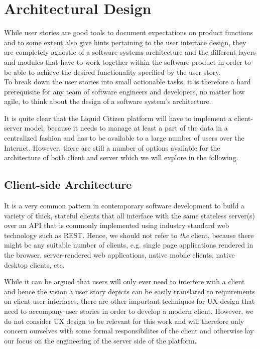 \section{Architectural Design}
\label{sec:ArchitecturalDesign}

While user stories are good tools to document expectations on product functions and to some extent also give hints pertaining to the user interface design, they are completely agnostic of a software systems architecture and the different layers and modules that have to work together within the software product in order to be able to achieve the desired functionality specified by the user story.\\
To break down the user stories into small actionable tasks, it is therefore a hard prerequisite for any team of software engineers and developers, no matter how agile, to think about the design of a software system's architecture.

It is quite clear that the Liquid Citizen platform will have to implement a client-server model, because it needs to manage at least a part of the data in a centralized fashion and has to be available to a large number of users over the Internet.
However, there are still a number of options available for the architecture of both client and server which we will explore in the following.

\subsection{Client-side Architecture}
\label{ssec:ClientSideArchitecture}
It is a very common pattern in contemporary software development to build a variety of thick, stateful clients that all interface with the same stateless server(s) over an API that is commonly implemented using industry standard web technology such as REST.
Hence, we should not refer to \textit{the} client, because there might be any suitable number of clients, e.g. single page applications rendered in the browser, server-rendered web applications, native mobile clients, native desktop clients, etc.

While it can be argued that users will only ever need to interfere with a client and hence the vision a user story depicts can be easily translated to requirements on client user interfaces, there are other important techniques for UX design that need to accompany user stories in order to develop a modern client.
However, we do not consider UX design to be relevant for this work and will therefore only concern ourselves with some formal responsibilites of the client and otherwise lay our focus on the engineering of the server side of the platform.

